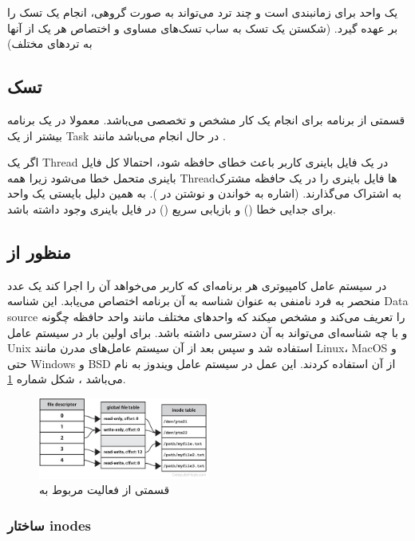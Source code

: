 \documentclass[10pt, a4paper]{article}
\begin{document}
یک واحد برای زمانبندی است و چند ترد می‌تواند به صورت گروهی، انجام یک تسک را بر
عهده گیرد. (شکستن یک تسک به  ساب تسک‌های مساوی و اختصاص هر یک از آنها به تردهای
مختلف)

\subsection{تسک}

قسمتی از برنامه برای انجام یک کار مشخص و تخصصی می‌باشد. معمولا در یک برنامه
بیشتر از یک Task در حال انجام می‌باشد \cite{tizenrtrepo} مانند .

اگر یک Thread در یک فایل باینری کاربر باعث خطای حافظه شود، احتمالا کل فایل‌
باینری متحمل خطا می‌شود زیرا همه Threadها فایل باینری را در یک حافظه مشترک به
اشتراک می‌گذارند. (اشاره به خواندن و نوشتن در ). به همین دلیل
بایستی یک واحد برای جدایی خطا () و بازیابی سریع () در فایل باینری وجود داشته باشد.

\subsection{منظور از }

در سیستم عامل کامپیوتری هر برنامه‌ای که کاربر می‌خواهد آن را اجرا کند یک عدد
منحصر به فرد نامنفی به عنوان شناسه به آن برنامه اختصاص می‌یابد. این شناسه Data
source را تعریف می‌کند و مشخص میکند که واحد‌های مختلف مانند واحد حافظه چگونه و
با چه شناسه‌ای می‌تواند به آن دسترسی داشته باشد.  برای اولین
بار در سیستم عامل Unix استفاده شد و سپس بعد از آن سیستم عامل‌های مدرن مانند
Linux، MacOS و حتی Windows و BSD از آن استفاده کردند. این عمل در سیستم عامل
ویندوز به نام  می‌باشد \cite{filedescriptor}، شکل شماره
\ref{fig:fileDescriptor}.

\begin{figure}[H]
    \centering
    \includegraphics[width=0.5\textwidth]{figs/file_descriptor.png}
    \caption{قسمتی از فعالیت مربوط به }
    \label{fig:fileDescriptor}
\end{figure}

\subsubsection{ساختار inodes}
\end{document}
